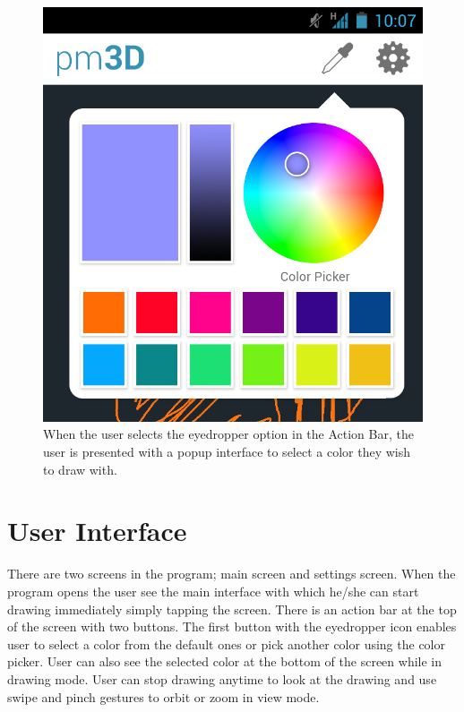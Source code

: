 \documentclass{chi-ext}
\begin{document}
\begin{figure}
\hspace{\columnwidth}%
\parbox{\columnwidth}{
  \centering
  \includegraphics[width=\columnwidth]{colorpicker.jpg}
  \caption{When the user selects the eyedropper option in the Action Bar, the user is presented with a popup interface to select a color they wish to draw with.}
  \label{fig:colorpicker}
}
\end{figure}


\section{User Interface}

There are two screens in the program; main screen and settings screen. When the program opens the user see the main interface with which he/she can start drawing immediately simply tapping the screen. There is an action bar at the top of the screen with two buttons. The first button with the eyedropper icon enables user to select a color from the default ones or pick another color using the  color picker. User can also see the selected color at the bottom of the screen while in drawing mode. User can stop drawing anytime to look at the drawing and use swipe and pinch gestures to orbit or zoom in view mode.
\end{document}
